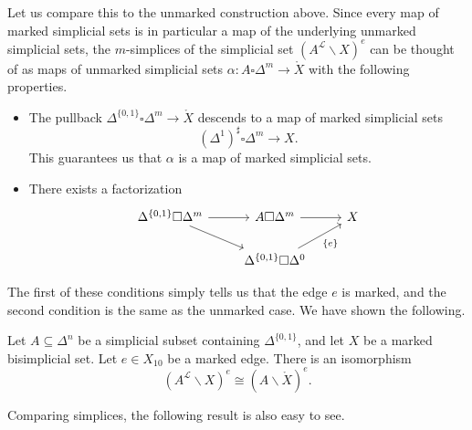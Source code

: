 \documentclass[main.tex]{subfiles}
\begin{document}
Let us compare this to the unmarked construction above. Since every map of marked simplicial sets is in particular a map of the underlying unmarked simplicial sets, the $m$-simplices of the simplicial set $(A^{\mathcal{L}} \backslash X)^{e}$ can be thought of as maps of unmarked simplicial sets $\alpha\colon A \square \Delta^{m} \to \mathring{X}$ with the following properties.
\begin{itemize}
  \item The pullback $\Delta^{\{0, 1\}} \square \Delta^{m} \to \mathring{X}$ descends to a map of marked simplicial sets
    \begin{equation*}
      (\Delta^{1})^{\sharp} \square \Delta^{m} \to X.
    \end{equation*}
    This guarantees us that $\alpha$ is a map of marked simplicial sets.


  \item There exists a factorization
    \begin{equation*}
      \begin{tikzcd}
        \Delta^{\{0, 1\}} \square \Delta^{m}
        \arrow[r]
        \arrow[dr]
        & A \square \Delta^{m}
        \arrow[r]
        & X
        \\
        & \Delta^{\{0, 1\}} \square \Delta^{0}
        \arrow[ur, swap, "\{e\}"]
      \end{tikzcd}
    \end{equation*}
\end{itemize}
The first of these conditions simply tells us that the edge $e$ is marked, and the second condition is the same as the unmarked case. We have shown the following.

\begin{lemma}
  \label{lemma:marked_vs_unmarked_with_first_morph_fixed}
  Let $A \subseteq \Delta^{n}$ be a simplicial subset containing $\Delta^{\{0, 1\}}$, and let $X$ be a marked bisimplicial set. Let $e \in X_{10}$ be a marked edge. There is an isomorphism
  \begin{equation*}
    (A^{\mathcal{L}} \backslash X)^{e} \cong (A \backslash \mathring{X})^{e}.
  \end{equation*}
\end{lemma}

Comparing simplices, the following result is also easy to see.
\end{document}
